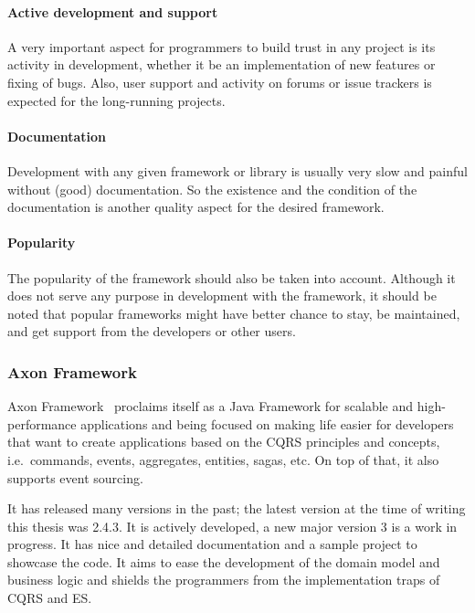 \documentclass{book}
\begin{document}
\paragraph{Active development and
support}\label{active-development-and-support}

A very important aspect for programmers to build trust in any project is
its activity in development, whether it be an implementation of new
features or fixing of bugs. Also, user support and activity on forums or
issue trackers is expected for the long-running projects.

\paragraph{Documentation}\label{documentation}

Development with any given framework or library is usually very slow and
painful without (good) documentation. So the existence and the condition
of the documentation is another quality aspect for the desired
framework.

\paragraph{Popularity}\label{popularity}

The popularity of the framework should also be taken into account.
Although it does not serve any purpose in development with the
framework, it should be noted that popular frameworks might have better
chance to stay, be maintained, and get support from the developers or
other users.

\subsubsection{Axon Framework}\label{axon-framework}

Axon Framework~\cite{axon} proclaims itself as a Java Framework for
scalable and high-performance applications and being focused on making
life easier for developers that want to create applications based on the
CQRS principles and concepts, i.e.~commands, events, aggregates,
entities, sagas, etc. On top of that, it also supports event sourcing.

It has released many versions in the past; the latest version at the
time of writing this thesis was 2.4.3. It is actively developed, a new
major version 3 is a work in progress. It has nice and detailed
documentation and a sample project to showcase the code. It aims to ease
the development of the domain model and business logic and shields the
programmers from the implementation traps of CQRS and ES.
\end{document}
